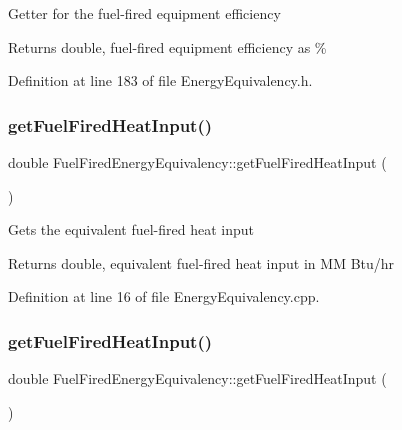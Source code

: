 Getter for the fuel-\/fired equipment efficiency

\begin{DoxyReturn}{Returns}
double, fuel-\/fired equipment efficiency as \% 
\end{DoxyReturn}


Definition at line 183 of file Energy\+Equivalency.\+h.

\mbox{\label{class_fuel_fired_energy_equivalency_a6bf68595ca361dd4135d0c84c2fbe6d9}} 
\subsubsection{\texorpdfstring{get\+Fuel\+Fired\+Heat\+Input()}{getFuelFiredHeatInput()}\hspace{0.1cm}{\footnotesize\ttfamily [1/3]}}
{\footnotesize\ttfamily double Fuel\+Fired\+Energy\+Equivalency\+::get\+Fuel\+Fired\+Heat\+Input (\begin{DoxyParamCaption}{ }\end{DoxyParamCaption})}

Gets the equivalent fuel-\/fired heat input \begin{DoxyReturn}{Returns}
double, equivalent fuel-\/fired heat input in MM Btu/hr 
\end{DoxyReturn}


Definition at line 16 of file Energy\+Equivalency.\+cpp.

\mbox{\label{class_fuel_fired_energy_equivalency_a6bf68595ca361dd4135d0c84c2fbe6d9}} 
\subsubsection{\texorpdfstring{get\+Fuel\+Fired\+Heat\+Input()}{getFuelFiredHeatInput()}\hspace{0.1cm}{\footnotesize\ttfamily [2/3]}}
{\footnotesize\ttfamily double Fuel\+Fired\+Energy\+Equivalency\+::get\+Fuel\+Fired\+Heat\+Input (\begin{DoxyParamCaption}{ }\end{DoxyParamCaption})}

